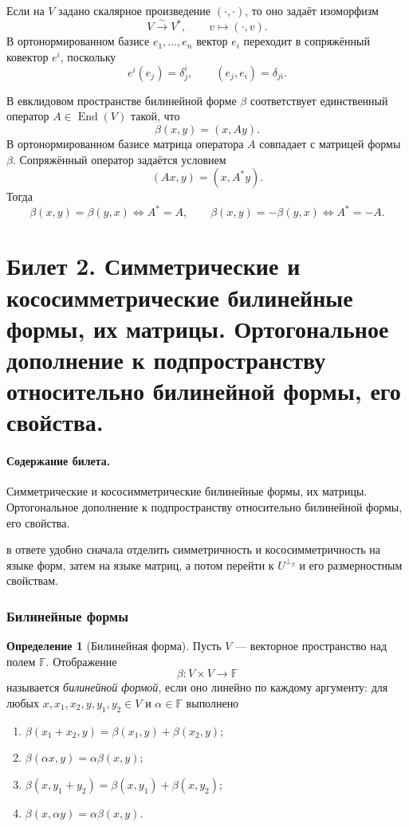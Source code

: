 \documentclass[12pt,a4paper]{article}
\theoremstyle{definition}
\newtheorem{definition}{Определение}[section]
\theoremstyle{plain}
\theoremstyle{remark}
\newenvironment{planadd}{\begin{planbox}}{\end{planbox}}
\newcommand{\F}{\mathbb{F}}
\newcommand{\End}{\operatorname{End}}
\begin{document}
Если на $V$ задано скалярное произведение $(\cdot,\cdot)$, то оно задаёт изоморфизм
\[
    V\xrightarrow{\sim} V^*,\qquad v\mapsto (\cdot,v).
\]
В ортонормированном базисе $e_1,\ldots,e_n$ вектор $e_i$ переходит в сопряжённый ковектор $e^i$, поскольку
\[
    e^i(e_j)=\delta^i_j,
    \qquad
    (e_j,e_i)=\delta_{ji}.
\]

В евклидовом пространстве билинейной форме $\beta$ соответствует единственный оператор $A\in\End(V)$ такой, что
\[
    \beta(x,y)=(x,Ay).
\]
В ортонормированном базисе матрица оператора $A$ совпадает с матрицей формы $\beta$.
Сопряжённый оператор задаётся условием
\[
    (Ax,y)=(x,A^*y).
\]
Тогда
\[
    \beta(x,y)=\beta(y,x)\Longleftrightarrow A^*=A,
    \qquad
    \beta(x,y)=-\beta(y,x)\Longleftrightarrow A^*=-A.
\]

\clearpage

\section{Билет 2. Симметрические и кососимметрические билинейные формы, их матрицы. Ортогональное дополнение к подпространству относительно билинейной формы, его свойства.}

\paragraph{Содержание билета.} Симметрические и кососимметрические билинейные формы, их матрицы. Ортогональное дополнение к подпространству относительно билинейной формы, его свойства.

\begin{planadd}

в ответе удобно сначала отделить симметричность и кососимметричность на языке форм, затем на языке матриц, а потом перейти к $U^{\perp_\beta}$ и его размерностным свойствам.

\end{planadd}

\subsubsection{Билинейные формы}


\begin{definition}[Билинейная форма]
Пусть $V$ --- векторное пространство над полем $\F$.
Отображение
\[
    \beta: V \times V \to \F
\]
называется \emph{билинейной формой}, если оно линейно по каждому аргументу:
для любых $x,x_1,x_2,y,y_1,y_2\in V$ и $\alpha\in\F$ выполнено
\begin{enumerate}[label=\arabic*)]
    \item $\beta(x_1+x_2,y)=\beta(x_1,y)+\beta(x_2,y)$;
    \item $\beta(\alpha x,y)=\alpha\beta(x,y)$;
    \item $\beta(x,y_1+y_2)=\beta(x,y_1)+\beta(x,y_2)$;
    \item $\beta(x,\alpha y)=\alpha\beta(x,y)$.
\end{enumerate}
\end{definition}
\end{document}
